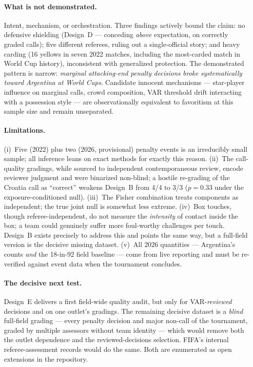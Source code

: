 \documentclass[11pt,a4paper]{article}
\newcommand{\pv}[1]{\ensuremath{p = #1}}
\begin{document}
\paragraph{What is not demonstrated.} Intent, mechanism, or orchestration. Three
findings actively bound the claim: no defensive shielding (Design~D --- conceding
\emph{above} expectation, on correctly graded calls); five different referees, ruling
out a single-official story; and heavy carding (16 yellows in seven 2022 matches,
including the most-carded match in World Cup history), inconsistent with generalized
protection. The demonstrated pattern is narrow: \emph{marginal attacking-end penalty
decisions broke systematically toward Argentina at World Cups}. Candidate innocent
mechanisms --- star-player influence on marginal calls, crowd composition, VAR
threshold drift interacting with a possession style --- are observationally
equivalent to favoritism at this sample size and remain unseparated.

\paragraph{Limitations.} (i)~Five (2022) plus two (2026, provisional) penalty events
is an irreducibly small sample; all inference leans on exact methods for exactly this
reason. (ii)~The call-quality gradings, while sourced to independent contemporaneous
review, encode reviewer judgment and were binarized non-blind; a hostile re-grading
of the Croatia call as
``correct'' weakens Design~B from 4/4 to 3/3 (\pv{0.33} under the
exposure-conditioned null). (iii)~The Fisher
combination treats components as independent; the true joint null is somewhat less
extreme. (iv)~Box touches, though referee-independent, do not measure the
\emph{intensity} of contact inside the box; a team could genuinely suffer more
foul-worthy challenges per touch. Design~B exists precisely to address this and
points the same way, but a full-field version is the decisive missing dataset.
(v)~All 2026 quantities --- Argentina's counts \emph{and} the 18-in-92 field
baseline --- come from live reporting and must be re-verified against event data
when the tournament concludes.

\paragraph{The decisive next test.} Design~E delivers a first field-wide quality
audit, but only for VAR-\emph{reviewed} decisions and on one outlet's gradings. The
remaining decisive dataset is a \emph{blind} full-field grading --- every penalty
decision and major non-call of the tournament, graded by multiple assessors without
team identity --- which would remove both the outlet dependence and the
reviewed-decisions selection. FIFA's internal referee-assessment records would do the
same. Both are enumerated as open extensions in the repository.
\end{document}
